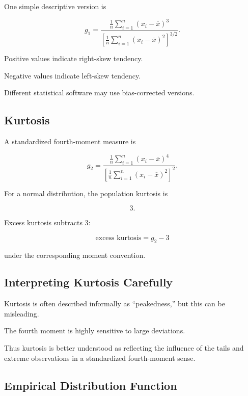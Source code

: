 One simple descriptive version is

\[
\boxed{
g_1
=
\frac{
\frac1n\sum_{i=1}^{n}
(x_i-\overline{x})^3
}{
\left[
\frac1n\sum_{i=1}^{n}
(x_i-\overline{x})^2
\right]^{3/2}
}.
}
\]

Positive values indicate right-skew tendency.

Negative values indicate left-skew tendency.

Different statistical software may use bias-corrected versions.

\subsection{Kurtosis}
\label{subsec:sample-kurtosis}

A standardized fourth-moment measure is

\[
\boxed{
g_2
=
\frac{
\frac1n\sum_{i=1}^{n}
(x_i-\overline{x})^4
}{
\left[
\frac1n\sum_{i=1}^{n}
(x_i-\overline{x})^2
\right]^2
}.
}
\]

For a normal distribution, the population kurtosis is

\[
3.
\]

Excess kurtosis subtracts \(3\):

\[
\boxed{
\text{excess kurtosis}
=
g_2-3
}
\]

under the corresponding moment convention.

\subsection{Interpreting Kurtosis Carefully}
\label{subsec:kurtosis-interpretation}

Kurtosis is often described informally as ``peakedness,'' but this can
be misleading.

The fourth moment is highly sensitive to large deviations.

Thus kurtosis is better understood as reflecting the influence of the
tails and extreme observations in a standardized fourth-moment sense.

\subsection{Empirical Distribution Function}
\label{subsec:empirical-distribution-function}

